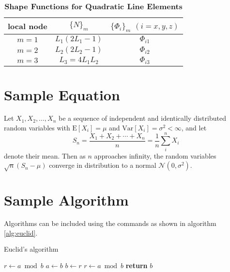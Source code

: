 \documentclass[9pt,twocolumn,twoside]{opticajnl}
\begin{document}
\begin{table}[htbp]
\centering
\caption{\bf Shape Functions for Quadratic Line Elements}
\begin{tabular}{ccc}
\hline
local node & $\{N\}_m$ & $\{\Phi_i\}_m$ $(i=x,y,z)$ \\
\hline
$m = 1$ & $L_1(2L_1-1)$ & $\Phi_{i1}$ \\
$m = 2$ & $L_2(2L_2-1)$ & $\Phi_{i2}$ \\
$m = 3$ & $L_3=4L_1L_2$ & $\Phi_{i3}$ \\
\hline
\end{tabular}
  \label{tab:shape-functions}
\end{table}

\section{Sample Equation}

Let $X_1, X_2, \ldots, X_n$ be a sequence of independent and identically distributed random variables with $\text{E}[X_i] = \mu$ and $\text{Var}[X_i] = \sigma^2 < \infty$, and let
\begin{equation}
S_n = \frac{X_1 + X_2 + \cdots + X_n}{n}
      = \frac{1}{n}\sum_{i}^{n} X_i
\label{eq:refname1}
\end{equation}
denote their mean. Then as $n$ approaches infinity, the random variables $\sqrt{n}(S_n - \mu)$ converge in distribution to a normal $\mathcal{N}(0, \sigma^2)$.

\section{Sample Algorithm}

Algorithms can be included using the commands as shown in algorithm \ref{alg:euclid}.

\begin{algorithm}
\caption{Euclid’s algorithm}\label{alg:euclid}
\begin{algorithmic}[1]
\State $r\gets a\bmod b$
\State $a\gets b$
\State $b\gets r$
\State $r\gets a\bmod b$
\EndWhile\label{euclidendwhile}
\State \textbf{return} $b$
\EndProcedure
\end{algorithmic}
\end{algorithm}
\end{document}
